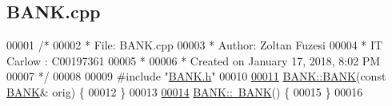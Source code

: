 \hypertarget{_b_a_n_k_8cpp_source}{}\subsection{B\+A\+N\+K.\+cpp}

\begin{DoxyCode}
00001 \textcolor{comment}{/* }
00002 \textcolor{comment}{ * File:   BANK.cpp}
00003 \textcolor{comment}{ * Author: Zoltan Fuzesi}
00004 \textcolor{comment}{ * IT Carlow : C00197361}
00005 \textcolor{comment}{ *}
00006 \textcolor{comment}{ * Created on January 17, 2018, 8:02 PM}
00007 \textcolor{comment}{ */}
00008 
00009 \textcolor{preprocessor}{#include "\hyperlink{_b_a_n_k_8h}{BANK.h}"}
00010 
\hypertarget{_b_a_n_k_8cpp_source.tex_l00011}{}\hyperlink{class_b_a_n_k_a4dd657c30039ea00a040e6226c23ccd4_a4dd657c30039ea00a040e6226c23ccd4}{00011} \hyperlink{class_b_a_n_k_a0bc938356cebff14fb0560264abe5a34_a0bc938356cebff14fb0560264abe5a34}{BANK::BANK}(\textcolor{keyword}{const} \hyperlink{class_b_a_n_k}{BANK}& orig) \{
00012 \}
00013 
\hypertarget{_b_a_n_k_8cpp_source.tex_l00014}{}\hyperlink{class_b_a_n_k_ad609a1e004efdebab6495d95eced2346_ad609a1e004efdebab6495d95eced2346}{00014} \hyperlink{class_b_a_n_k_ad609a1e004efdebab6495d95eced2346_ad609a1e004efdebab6495d95eced2346}{BANK::~BANK}() \{
00015 \}
00016 
\end{DoxyCode}
